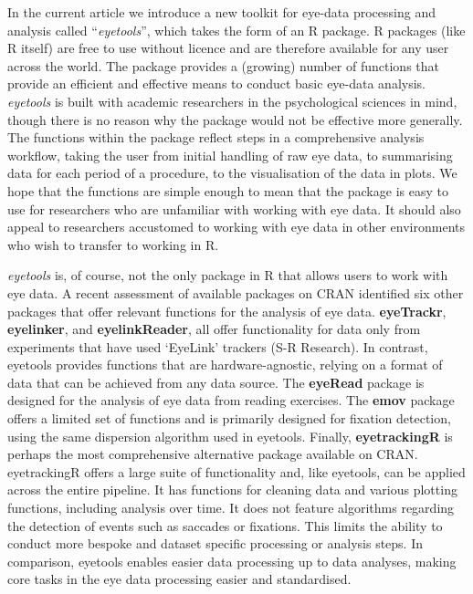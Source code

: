 \documentclass[
  man,
  floatsintext,
  longtable,
  nolmodern,
  notxfonts,
  notimes,
  colorlinks=true,linkcolor=blue,citecolor=blue,urlcolor=blue]{apa7}
\begin{document}
In the current article we introduce a new toolkit for eye-data
processing and analysis called ``\emph{eyetools}'', which takes the form
of an R package. R packages (like R itself) are free to use without
licence and are therefore available for any user across the world. The
package provides a (growing) number of functions that provide an
efficient and effective means to conduct basic eye-data analysis.
\emph{eyetools} is built with academic researchers in the psychological
sciences in mind, though there is no reason why the package would not be
effective more generally. The functions within the package reflect steps
in a comprehensive analysis workflow, taking the user from initial
handling of raw eye data, to summarising data for each period of a
procedure, to the visualisation of the data in plots. We hope that the
functions are simple enough to mean that the package is easy to use for
researchers who are unfamiliar with working with eye data. It should
also appeal to researchers accustomed to working with eye data in other
environments who wish to transfer to working in R.

\emph{eyetools} is, of course, not the only package in R that allows
users to work with eye data. A recent assessment of available packages
on CRAN identified six other packages that offer relevant functions for
the analysis of eye data. \textbf{eyeTrackr}, \textbf{eyelinker}, and
\textbf{eyelinkReader}, all offer functionality for data only from
experiments that have used `EyeLink' trackers (S-R Research). In
contrast, eyetools provides functions that are hardware-agnostic,
relying on a format of data that can be achieved from any data source.
The \textbf{eyeRead} package is designed for the analysis of eye data
from reading exercises. The \textbf{emov} package offers a limited set
of functions and is primarily designed for fixation detection, using the
same dispersion algorithm used in eyetools. Finally,
\textbf{eyetrackingR} is perhaps the most comprehensive alternative
package available on CRAN. eyetrackingR offers a large suite of
functionality and, like eyetools, can be applied across the entire
pipeline. It has functions for cleaning data and various plotting
functions, including analysis over time. It does not feature algorithms
regarding the detection of events such as saccades or fixations. This
limits the ability to conduct more bespoke and dataset specific
processing or analysis steps. In comparison, eyetools enables easier
data processing up to data analyses, making core tasks in the eye data
processing easier and standardised.
\end{document}
